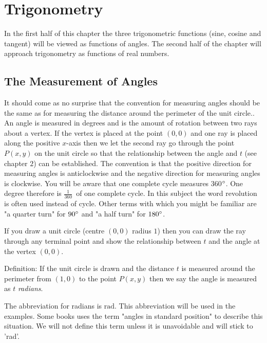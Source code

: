 \chapter{Trigonometry}

In the first half of this chapter the three trigonometric functions (sine, cosine and tangent) will be viewed as functions of angles. The second half of the chapter will approach trigonometry as functions of real numbers.

\section{The Measurement of Angles}
It should come as no surprise that the convention for measuring angles should be the same as for measuring
the distance around the perimeter of the unit circle.. An angle is measured in degrees and is the amount of
rotation between two rays about a vertex. If the vertex is placed at the point $\left (0 ,0\right )$ and one ray is placed along the positive $x$-axis then we let the second ray go through the point $P (x ,y)$ on the unit circle so that the relationship between the angle and $t$ (see chapter $2$) can be established. The convention is that the positive direction for measuring
angles is anticlockwise and the negative direction for measuring angles is clockwise. You will be aware that
one complete cycle measures 360$\mbox{{\ensuremath{{}^\circ}}}$. One degree therefore is $\frac{1}{360}$\ of one complete cycle. In this subject the
word revolution is often used instead of cycle. Other terms with which you might be familiar are "a quarter
turn" for $90 \mbox{{\ensuremath{{}^\circ}}}$ and "a half turn" for $180 \mbox{{\ensuremath{{}^\circ}}}$. 

If you draw a unit circle (centre $\left (0 ,0\right )$ radius $1$) then you can draw the ray through any terminal point and show the relationship between $t$ and the angle at the vertex $\left (0 ,0\right )$. 

Definition: If the unit circle is drawn and the distance $t$ is measured around the perimeter from $\left (1 ,0\right )$ to the point $P (x ,y)$ then we say the angle is measured as $t$ \emph{radians}. 

The abbreviation for radians is $\mbox{rad}$. This abbreviation will be used in the examples.
Some books uses the term "angles in standard position" to describe this situation. We
will not define this term unless it is unavoidable and will stick to 'rad'.

